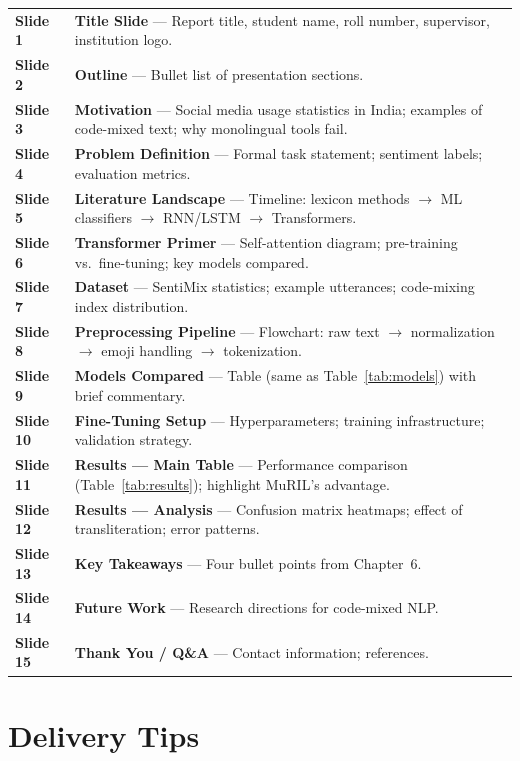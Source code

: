 \documentclass[12pt,a4paper]{report}
\renewcommand{\arraystretch}{1.15}
\begin{document}
\renewcommand{\arraystretch}{1.3}
\begin{tabularx}{\linewidth}{@{}>{\color{accent}\bfseries}l@{\hspace{8mm}}>{\raggedright\arraybackslash}X@{}}
Slide 1  & \textbf{Title Slide} — Report title, student name, roll number, supervisor, institution logo. \\
Slide 2  & \textbf{Outline} — Bullet list of presentation sections. \\
Slide 3  & \textbf{Motivation} — Social media usage statistics in India; examples of code-mixed text; why monolingual tools fail. \\
Slide 4  & \textbf{Problem Definition} — Formal task statement; sentiment labels; evaluation metrics. \\
Slide 5  & \textbf{Literature Landscape} — Timeline: lexicon methods $\rightarrow$ ML classifiers $\rightarrow$ RNN/LSTM $\rightarrow$ Transformers. \\
Slide 6  & \textbf{Transformer Primer} — Self-attention diagram; pre-training vs.\ fine-tuning; key models compared. \\
Slide 7  & \textbf{Dataset} — SentiMix statistics; example utterances; code-mixing index distribution. \\
Slide 8  & \textbf{Preprocessing Pipeline} — Flowchart: raw text $\rightarrow$ normalization $\rightarrow$ emoji handling $\rightarrow$ tokenization. \\
Slide 9  & \textbf{Models Compared} — Table (same as Table~\ref{tab:models}) with brief commentary. \\
Slide 10 & \textbf{Fine-Tuning Setup} — Hyperparameters; training infrastructure; validation strategy. \\
Slide 11 & \textbf{Results — Main Table} — Performance comparison (Table~\ref{tab:results}); highlight MuRIL's advantage. \\
Slide 12 & \textbf{Results — Analysis} — Confusion matrix heatmaps; effect of transliteration; error patterns. \\
Slide 13 & \textbf{Key Takeaways} — Four bullet points from Chapter~6. \\
Slide 14 & \textbf{Future Work} — Research directions for code-mixed NLP. \\
Slide 15 & \textbf{Thank You / Q\&A} — Contact information; references.
\end{tabularx}

\section*{Delivery Tips}
\end{document}

